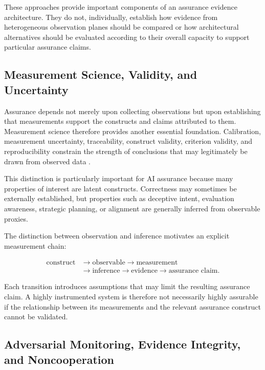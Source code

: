 These approaches provide important components of an assurance evidence architecture.
They do not, individually, establish how evidence from heterogeneous observation planes should be compared or how architectural alternatives should be evaluated according to their overall capacity to support particular assurance claims.

\subsection{Measurement Science, Validity, and Uncertainty}

Assurance depends not merely upon collecting observations but upon establishing that measurements support the constructs and claims attributed to them.
Measurement science therefore provides another essential foundation.
Calibration, measurement uncertainty, traceability, construct validity, criterion validity, and
reproducibility constrain the strength of conclusions that may legitimately be drawn from observed data \cite{jcgm2008gum, messick1995validity}.

This distinction is particularly important for AI assurance because many properties of interest are latent constructs.
Correctness may sometimes be externally established, but properties such as deceptive intent, evaluation awareness,
strategic planning, or alignment are generally inferred from observable proxies.

The distinction between observation and inference motivates an explicit measurement chain:

\begin{equation}
  \begin{aligned}
    \text{construct}
     & \rightarrow \text{observable}
    \rightarrow \text{measurement}   \\
     & \rightarrow \text{inference}
    \rightarrow \text{evidence}
    \rightarrow \text{assurance claim}.
  \end{aligned}
\end{equation}

Each transition introduces assumptions that may limit the resulting assurance claim.
A highly instrumented system is therefore not necessarily highly assurable if the
relationship between its measurements and the relevant assurance construct cannot be validated.

\subsection{Adversarial Monitoring, Evidence Integrity, and Noncooperation}

